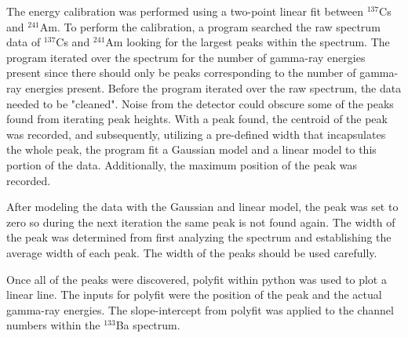 The energy calibration was performed using a two-point linear fit between
$^{137}$Cs and $^{241}$Am. To perform the calibration, a program searched
the raw spectrum data of $^{137}$Cs and $^{241}$Am looking for
the largest peaks within the spectrum. The program iterated over the spectrum for the
number of gamma-ray energies present since there should only be peaks corresponding
to the number of gamma-ray energies present. Before the program iterated over the raw spectrum,
the data needed to be "cleaned". Noise from the detector could obscure some of the peaks
found from iterating peak heights. With a peak found, the centroid of the peak was
recorded, and subsequently, utilizing a pre-defined width that incapsulates
the whole peak, the program fit a Gaussian model and a linear model to this portion of the data.
Additionally, the maximum position of the peak was recorded.

After modeling the data with the Gaussian and linear model, the peak was
set to zero so during the next iteration the same peak is not found again.
The width of the peak was determined from first analyzing the spectrum and establishing
the average width of each peak. The width of the peaks should be used carefully.

Once all of the peaks were discovered, polyfit within python was used to
plot a linear line. The inputs for polyfit were the position of the peak and
the actual gamma-ray energies. The slope-intercept from polyfit was applied
to the channel numbers within the $^{133}$Ba spectrum. 
